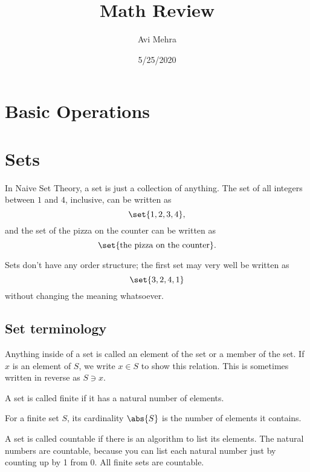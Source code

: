 \documentclass[12pt,paper=letter]{scrartcl}
\begin{document}
    \title{Math Review}
    \author{Avi Mehra}
    \date{5/25/2020}
    \maketitle


    \section{Basic Operations}


    \section{Sets}
    In Naive Set Theory,
    a set is just a collection of anything.
    The set of all integers between $1$ and $4$, inclusive,
    can be written as
    \[
        \set{1,2,3,4},
    \]
    and the set of the pizza on the counter can be written as
    \[
        \set{\text{the pizza on the counter}}.
    \]

    Sets don't have any order structure;
    the first set may very well be written as
    \[
        \set{3,2,4,1}
    \]
    without changing the meaning whatsoever.

    \subsection{Set terminology}
    \begin{defboxed}
        Anything inside of a set is called an element of the set or a member of the set.
        If $x$ is an element of $S$,
        we write $x\in S$ to show this relation.
        This is sometimes written in reverse as $S\ni x$.
    \end{defboxed}

    \begin{defboxed}
        A set is called finite if it has a natural number of elements.
    \end{defboxed}

    \begin{defboxed}
        For a finite set $S$,
        its cardinality $\abs{S}$ is the number of elements it contains.
    \end{defboxed}

    \begin{defboxed}
        A set is called countable if there is an algorithm to list its elements.
        The natural numbers are countable, because you can list each natural number just by counting up by 1 from 0.
        All finite sets are countable.
    \end{defboxed}
\end{document}
